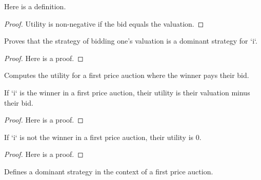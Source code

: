 \begin{lemma}\label{utility_nneg}
    \leanok
    Here is a definition.
\end{lemma}
\begin{proof}
    Utility is non-negative if the bid equals the valuation.
\end{proof}

\begin{lemma}\label{valuation_is_dominant}
    \leanok
          Proves that the strategy of bidding one's valuation is a dominant strategy for `i`.
\end{lemma}
\begin{proof}
    Here is a proof.
\end{proof}

\begin{definition}\label{Utility.FirstPrice}
    \leanok
    Computes the utility for a first price auction where the winner pays their bid.
\end{definition}

\begin{lemma}\label{utility_first_price_winner}
    \leanok
    If `i` is the winner in a first price auction, their utility is their valuation minus their bid.
\end{lemma}
\begin{proof}
    Here is a proof.
\end{proof}

\begin{lemma}\label{utility_first_price_loser}
    \leanok
    If `i` is not the winner in a first price auction, their utility is 0.
\end{lemma}
\begin{proof}
    Here is a proof.
\end{proof}

\begin{definition}\label{Dominant.FirstPrice}
    \leanok
    Defines a dominant strategy in the context of a first price auction.
\end{definition}

